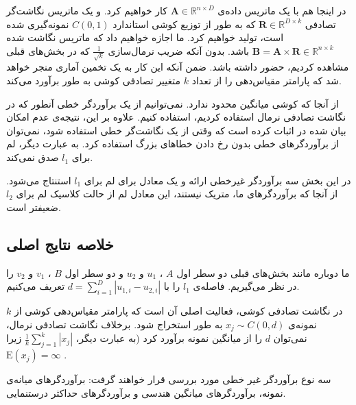 در اینجا هم با یک ماتریس داده‌ی 
$\mathbf{A} \in \mathbb{R}^{n \times D}$
کار خواهیم کرد. و یک ماتریس نگاشت‌گر تصادفی 
$\mathbf{R} \in \mathbb{R}^{D \times k}$
که به طور 
از توزیع کوشی استاندارد 
$C(0,1)$
نمونه‌گیری شده است، تولید خواهیم کرد.
ما اجازه خواهیم داد که ماتریس نگاشت‌ شده 
$\mathbf{B} = \mathbf{A} \times \mathbf{R} \in \mathbb{R}^{n \times k}$
باشد. بدون آنکه ضریب نرمال‌سازی 
$\frac{1}{\sqrt{k}}$
که در بخش‌های قبلی مشاهده کردیم، حضور داشته باشد. ضمن آنکه این کار به یک تخمین آماری منجر خواهد شد که پارامتر مقیاس‌دهی را از تعداد 
$k$
متغییر تصادفی کوشی به طور 
برآورد می‌کند.

از آنجا که کوشی میانگین محدود ندارد. نمی‌توانیم از یک برآوردگر خطی آنطور که در نگاشت تصادفی نرمال استفاده کردیم، استفاده کنیم. علاوه بر این، نتیجه‌ی عدم امکان بیان شده در 
\cite{litez32, litez109, litez33}
اثبات کرده است که وقتی از یک نگاشت‌گر خطی استفاده شود، نمی‌توان از برآوردگرهای خطی بدون رخ دادن خطاهای بزرگ استفاده کرد. به عبارت دیگر، لم
برای 
$l_1$
صدق نمی‌کند.

در این بخش سه برآوردگر غیرخطی ارائه و یک معادل برای لم 
برای 
$l_1$
استنتاج  می‌شود. از آنجا که برآوردگرهای ما، متریک نیستند، این معادل لم 
از حالت کلاسیک لم
برای 
$l_2$
ضعیفتر است.

\subsection{
خلاصه نتایج اصلی
}

ما دوباره مانند بخش‌های قبلی دو سطر اول 
$A$
،
$u_1$
و 
$u_2$
و دو سطر اول 
$B$
،
$v_1$
و 
$v_2$
را در نظر می‌گیریم. فاصله‌ی 
$l_1$
را با 
$d = \sum_{i=1}^D | u_{1,i} - u_{2,i} | $
تعریف می‌کنیم. 

در نگاشت تصادفی کوشی، فعالیت اصلی آن است که پارامتر مقیاس‌دهی کوشی از 
$k$
نمونه‌ی 
$x_j \sim C(0,d)$
به طور 
استخراج شود. برخلاف نگاشت تصادفی نرمال، نمی‌توان 
$d$ 
را از میانگین نمونه برآورد کرد (به عبارت دیگر، 
$\frac{1}{k} \sum_{j=1}^k \left| x_j \right|$
زیرا 
$\mathrm{E}(x_j) = \infty$
. 

سه نوع برآوردگر غیر خطی مورد بررسی قرار خواهند گرفت: برآوردگرهای میانه‌ی نمونه، برآوردگرهای میانگین هندسی و برآوردگرهای حداکثر درستنمایی.

